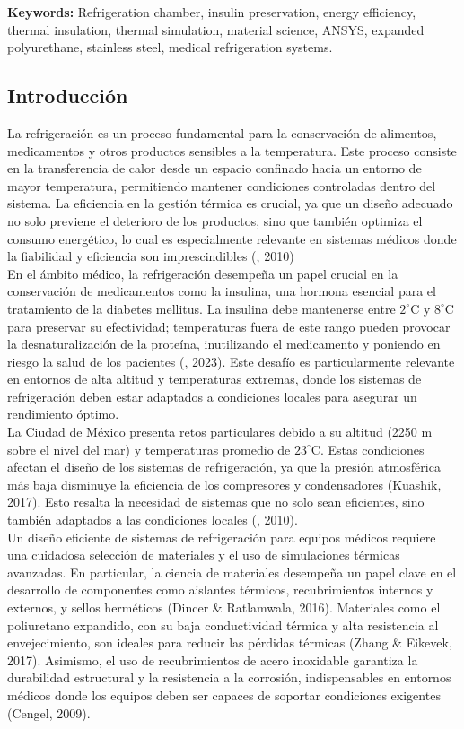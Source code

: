 \documentclass[11pt,a4paper]{article}
\begin{document}
\textbf{Keywords:} Refrigeration chamber, insulin preservation, energy efficiency, thermal insulation, thermal simulation, material science, ANSYS, expanded polyurethane, stainless steel, medical refrigeration systems.


\setlength{\columnsep}{1cm}
\begin{multicols}{2}
	
\section{Introducción}
La refrigeración es un proceso fundamental para la conservación de alimentos, medicamentos y otros productos sensibles a la temperatura. Este proceso consiste en la transferencia de calor desde un espacio confinado hacia un entorno de mayor temperatura, permitiendo mantener condiciones controladas dentro del sistema. La eficiencia en la gestión térmica es crucial, ya que un diseño adecuado no solo previene el deterioro de los productos, sino que también optimiza el consumo energético, lo cual es especialmente relevante en sistemas médicos donde la fiabilidad y eficiencia son imprescindibles (\citeauthor{Dincer2010-re}, 2010)\\
En el ámbito médico, la refrigeración desempeña un papel crucial en la conservación de medicamentos como la insulina, una hormona esencial para el tratamiento de la diabetes mellitus. La insulina debe mantenerse entre $2^\circ$C y $8^\circ$C para preservar su efectividad; temperaturas fuera de este rango pueden provocar la desnaturalización de la proteína, inutilizando el medicamento y poniendo en riesgo la salud de los pacientes (\citeauthor{ashrae-about}, 2023). Este desafío es particularmente relevante en entornos de alta altitud y temperaturas extremas, donde los sistemas de refrigeración deben estar adaptados a condiciones locales para asegurar un rendimiento óptimo.\\
La Ciudad de México presenta retos particulares debido a su altitud (2250 m sobre el nivel del mar) y temperaturas promedio de $23^\circ$C. Estas condiciones afectan el diseño de los sistemas de refrigeración, ya que la presión atmosférica más baja disminuye la eficiencia de los compresores y condensadores (Kuashik, 2017). Esto resalta la necesidad de sistemas que no solo sean eficientes, sino también adaptados a las condiciones locales (\citeauthor{Dincer2010-re}, 2010).\\
Un diseño eficiente de sistemas de refrigeración para equipos médicos requiere una cuidadosa selección de materiales y el uso de simulaciones térmicas avanzadas. En particular, la ciencia de materiales desempeña un papel clave en el desarrollo de componentes como aislantes térmicos, recubrimientos internos y externos, y sellos herméticos (Dincer \& Ratlamwala, 2016). Materiales como el poliuretano expandido, con su baja conductividad térmica y alta resistencia al envejecimiento, son ideales para reducir las pérdidas térmicas (Zhang \& Eikevek, 2017). Asimismo, el uso de recubrimientos de acero inoxidable garantiza la durabilidad estructural y la resistencia a la corrosión, indispensables en entornos médicos donde los equipos deben ser capaces de soportar condiciones exigentes (Cengel, 2009).

\end{multicols}
\end{document}
